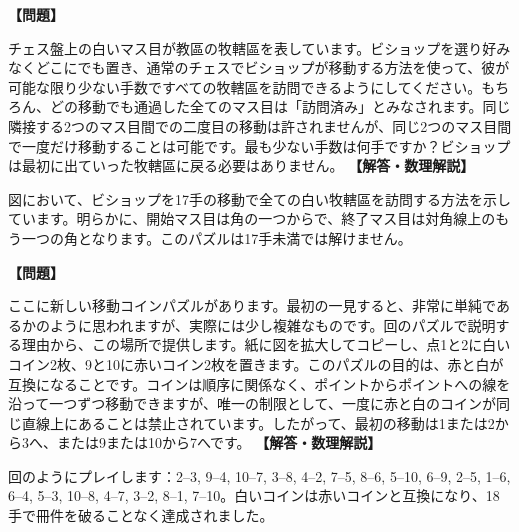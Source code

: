 \documentclass[10pt,a4paper,oneside,openany]{ltjsbook}
\begin{document}
\begin{tcolorbox}[colback=softblue,colframe=primaryblue,title=\textbf{第 325 問：主教の訪問 （原題: AN EPISCOPAL VISITATION.）},arc=2mm,boxrule=1pt,breakable]
\textbf{【問題】}\par\vspace{0.3em}
チェス盤上の白いマス目が教區の牧轄區を表しています。ビショップを選り好みなくどこにでも置き、通常のチェスでビショップが移動する方法を使って、彼が可能な限り少ない手数ですべての牧轄區を訪問できるようにしてください。もちろん、どの移動でも通過した全てのマス目は「訪問済み」とみなされます。同じ隣接する2つのマス目間での二度目の移動は許されませんが、同じ2つのマス目間で一度だけ移動することは可能です。最も少ない手数は何手ですか？ビショップは最初に出ていった牧轄區に戻る必要はありません。
\tcblower
\textbf{【解答・数理解説】}\par\vspace{0.3em}
図において、ビショップを17手の移動で全ての白い牧轄區を訪問する方法を示しています。明らかに、開始マス目は角の一つからで、終了マス目は対角線上のもう一つの角となります。このパズルは17手未満では解けません。
\end{tcolorbox}

\begin{tcolorbox}[colback=softblue,colframe=primaryblue,title=\textbf{第 326 問：新しいコインパズル （原題: A NEW COUNTER PUZZLE.）},arc=2mm,boxrule=1pt,breakable]
\textbf{【問題】}\par\vspace{0.3em}
ここに新しい移動コインパズルがあります。最初の一見すると、非常に単純であるかのように思われますが、実際には少し複雑なものです。回のパズルで説明する理由から、この場所で提供します。紙に図を拡大してコピーし、点1と2に白いコイン2枚、9と10に赤いコイン2枚を置きます。このパズルの目的は、赤と白が互換になることです。コインは順序に関係なく、ポイントからポイントへの線を沿って一つずつ移動できますが、唯一の制限として、一度に赤と白のコインが同じ直線上にあることは禁止されています。したがって、最初の移動は1または2から3へ、または9または10から7へです。
\tcblower
\textbf{【解答・数理解説】}\par\vspace{0.3em}
回のようにプレイします：2--3, 9--4, 10--7, 3--8, 4--2, 7--5, 8--6, 5--10, 6--9, 2--5, 1--6, 6--4, 5--3, 10--8, 4--7, 3--2, 8--1, 7--10。白いコインは赤いコインと互換になり、18手で冊件を破ることなく達成されました。
\end{tcolorbox}
\end{document}
